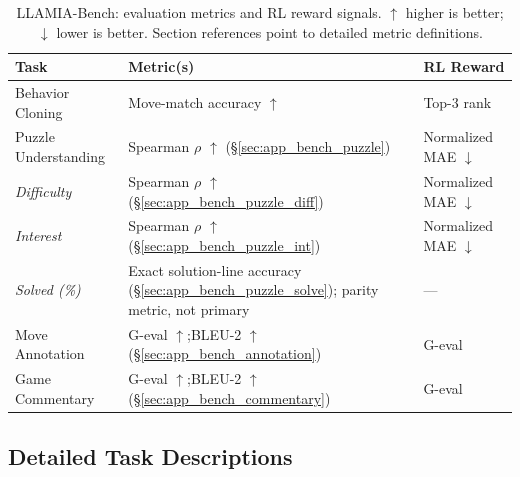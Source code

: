 \begin{table}[ht]
\centering
\small
\setlength{\tabcolsep}{5pt}
\renewcommand{\arraystretch}{1.3}
\caption{LLAMIA-Bench: evaluation metrics and RL reward signals. $\uparrow$ higher is better; $\downarrow$ lower is better. Section references point to detailed metric definitions.}
\label{tab:bench_metrics}
\vspace{4pt}
\begin{tabular}{p{3.5cm} p{5.2cm} p{3.4cm}}
\toprule
\textbf{Task} & \textbf{Metric(s)} & \textbf{RL Reward} \\
\midrule
Behavior Cloning       & Move-match accuracy $\uparrow$                                              & Top-3 rank \\
Puzzle Understanding   & Spearman $\rho$ $\uparrow$ (\S\ref{sec:app_bench_puzzle})                   & Normalized MAE $\downarrow$ \\
{\scriptsize\quad\emph{Difficulty}} & {\scriptsize Spearman $\rho$ $\uparrow$ (\S\ref{sec:app_bench_puzzle_diff})} & {\scriptsize Normalized MAE $\downarrow$} \\
{\scriptsize\quad\emph{Interest}}   & {\scriptsize Spearman $\rho$ $\uparrow$ (\S\ref{sec:app_bench_puzzle_int})}  & {\scriptsize Normalized MAE $\downarrow$} \\
{\scriptsize\quad\emph{Solved (\%)}} & {\scriptsize Exact solution-line accuracy (\S\ref{sec:app_bench_puzzle_solve}); parity metric, not primary} & {\scriptsize ---} \\
Move Annotation        & G-eval $\uparrow$;\enspace BLEU-2 $\uparrow$ (\S\ref{sec:app_bench_annotation}) & G-eval \\
Game Commentary        & G-eval $\uparrow$;\enspace BLEU-2 $\uparrow$ (\S\ref{sec:app_bench_commentary}) & G-eval \\
\bottomrule
\end{tabular}
\end{table}

\subsection{Detailed Task Descriptions}
\label{sec:app_bench_tasks}


